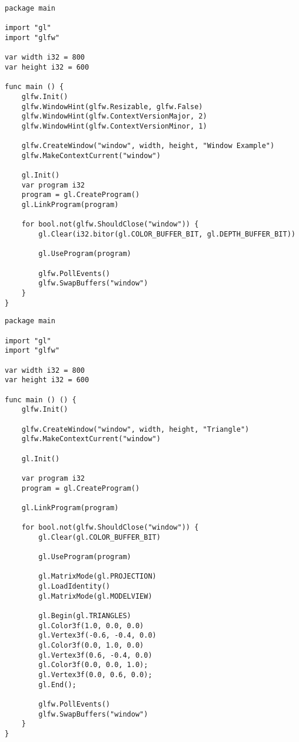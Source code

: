 \documentclass[11pt,fleqn,openany]{book} %
\begin{document}
\begin{lstlisting}[caption={Creating a Window using OpenGL},captionpos=b,label={listing:window-opengl}]
package main

import "gl"
import "glfw"

var width i32 = 800
var height i32 = 600

func main () {
	glfw.Init()
	glfw.WindowHint(glfw.Resizable, glfw.False)
	glfw.WindowHint(glfw.ContextVersionMajor, 2)
	glfw.WindowHint(glfw.ContextVersionMinor, 1)

	glfw.CreateWindow("window", width, height, "Window Example")
	glfw.MakeContextCurrent("window")
	
	gl.Init()
	var program i32
	program = gl.CreateProgram()
	gl.LinkProgram(program)
	
	for bool.not(glfw.ShouldClose("window")) {
		gl.Clear(i32.bitor(gl.COLOR_BUFFER_BIT, gl.DEPTH_BUFFER_BIT))

		gl.UseProgram(program)

		glfw.PollEvents()
		glfw.SwapBuffers("window")
	}
}
\end{lstlisting}

\begin{lstlisting}[caption={Drawing a Triangle to a Window},captionpos=b,label={listing:triangle}]
package main

import "gl"
import "glfw"

var width i32 = 800
var height i32 = 600

func main () () {
	glfw.Init()

	glfw.CreateWindow("window", width, height, "Triangle")
	glfw.MakeContextCurrent("window")
	
	gl.Init()
	
	var program i32
	program = gl.CreateProgram()
	
	gl.LinkProgram(program)

	for bool.not(glfw.ShouldClose("window")) {
		gl.Clear(gl.COLOR_BUFFER_BIT)

		gl.UseProgram(program)
		
		gl.MatrixMode(gl.PROJECTION)
		gl.LoadIdentity()
		gl.MatrixMode(gl.MODELVIEW)

		gl.Begin(gl.TRIANGLES)
		gl.Color3f(1.0, 0.0, 0.0)
		gl.Vertex3f(-0.6, -0.4, 0.0)
		gl.Color3f(0.0, 1.0, 0.0)
		gl.Vertex3f(0.6, -0.4, 0.0)
		gl.Color3f(0.0, 0.0, 1.0);
		gl.Vertex3f(0.0, 0.6, 0.0);
		gl.End();
		
		glfw.PollEvents()
		glfw.SwapBuffers("window")
	}
}
\end{lstlisting}
\end{document}
